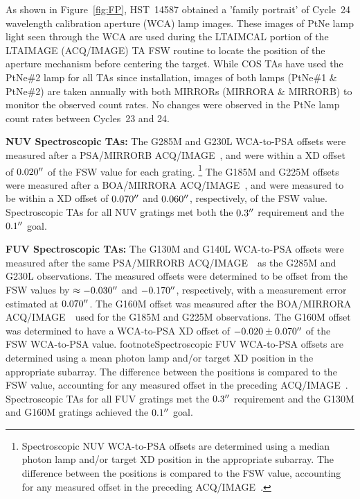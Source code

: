\documentclass[12pt]{reportj}
\def\arcsec{\hbox{$^{\prime\prime}$}}
\newcommand*{\myfont}{\fontfamily{rm}\selectfont}
\def\acqimage{{\myfont ACQ/IMAGE}\rm~}
\begin{document}
\begin{description}
	As shown in Figure~\ref{fig:FP}, HST~14587 obtained a 'family portrait' of Cycle~24 wavelength calibration aperture (WCA) lamp images. These images of PtNe lamp light seen through the WCA
	are used during the LTAIMCAL portion of the LTAIMAGE (ACQ/IMAGE) TA FSW routine to locate the position of the aperture mechanism before centering the target.
	While COS TAs have used the PtNe\#2 lamp for all TAs since installation, images of both lamps (PtNe\#1 \& PtNe\#2) are taken annually with both MIRRORs
	(MIRRORA \& MIRRORB) to monitor the observed count rates. No changes were observed in the PtNe lamp count rates between Cycles~23 and 24.
	\clearpage
\item{\bf NUV Spectroscopic TAs:}
	The G285M and G230L WCA-to-PSA offsets were measured after a PSA/MIRRORB \acqimage, and were within a XD offset of $0.020\arcsec$ of the FSW value for each grating.
	\footnote{Spectroscopic NUV WCA-to-PSA offsets are determined using a median photon lamp and/or target XD position in the appropriate subarray. The difference between the positions is compared to the FSW value, accounting for any measured offset in the preceding \acqimage.}
	The G185M and G225M offsets were measured after a BOA/MIRRORA \acqimage, and were measured to be within a XD offset of $0.070\arcsec$ and $0.060\arcsec$, respectively, of the FSW value.
	Spectroscopic TAs for all NUV gratings met both the $0.3\arcsec$ requirement and the $0.1\arcsec$ goal.
\item{\bf FUV Spectroscopic TAs:}
	The G130M and G140L WCA-to-PSA offsets were measured after the same PSA/MIRRORB \acqimage~as the G285M and G230L observations.
	The measured offsets were determined to be offset from the FSW values by $\approx -0.030\arcsec$ and $-0.170\arcsec$, respectively, with a measurement error estimated at $0.070\arcsec$.
	The G160M offset was measured after the BOA/MIRRORA \acqimage~used for the G185M and G225M observations. The G160M offset was determined to have a WCA-to-PSA XD offset of $-0.020 \pm 0.070\arcsec$ of the FSW WCA-to-PSA value.
footnote{Spectroscopic FUV WCA-to-PSA offsets are determined using a mean photon lamp and/or target XD position in the appropriate subarray. The difference between the positions is compared to the FSW value, accounting for any measured offset in the preceding \acqimage.}
	Spectroscopic TAs for all FUV gratings met the $0.3\arcsec$ requirement and the G130M and G160M gratings achieved the $0.1\arcsec$ goal.
	\begin{figure}[!h]
	\vspace{1.3cm}

\end{figure}
\end{description}
\end{document}
